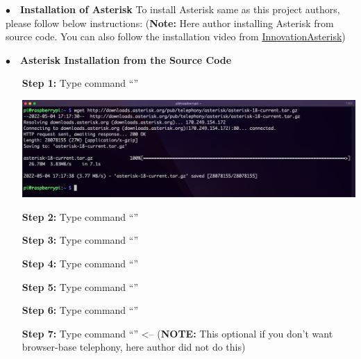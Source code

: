 \noindent$\bullet$~~\textbf{Installation of Asterisk}	\label{sec:run-asterisk}
	To install Asterisk same as this project authors, please follow below instructions: (\textbf{Note:} Here author installing Asterisk from source code. You can also follow the installation video from \href{https://www.youtube.com/watch?v=52sEPVPV9JE&list=PLruX0IBTg1G4Auvo5YhoJKgskmMP7b8bJ&index=4&ab_channel=InnovateAsterisk}{InnovationAsterisk})
	
\noindent$\bullet$~~\textbf{Asterisk Installation from the Source Code}
		\begin{itemize}[leftmargin=1.7cm]
			\item[\textbf{Step 1:}] Type command ``{\selectfont{wget http://downloads.as\\terisk.org/pub/telephony/asterisk/aste\\risk-18-current.tar.gz}}''\\
				\begin{minipage}{\textwidth}
					\vspace{2mm}
					\includegraphics[scale=0.135]{Images/raspberry_pi/asterisk_install/wget.png}
					\vspace{2mm}
				\end{minipage}
			
			\item[\textbf{Step 2:}] Type command ``{\selectfont{sudo apt-get update}}''
			\item[\textbf{Step 3:}] Type command ``{\selectfont{sudo apt-get upgrade}}''
			\item[\textbf{Step 4:}] Type command ``{\selectfont{sudo apt-get install ntp}}''
			\item[\textbf{Step 5:}] Type command ``{\selectfont{sudo apt-get install spe\\ex speex* libspeex-dev libspeexdsp-dev\\}}''
			\item[\textbf{Step 6:}] Type command ``{\selectfont{sudo apt-get install lib\\speex-dev libspeexdsp-dev speex speex-\\doc}}''
			\item[\textbf{Step 7:}] Type command ``{\selectfont{sudo apt-get install xm\\lstarlet libopus-dev libopusfile-dev}}'' <-- (\textbf{NOTE:} This optional if you don't want browser-base telephony, here author did not do this)
			

\end{itemize}
